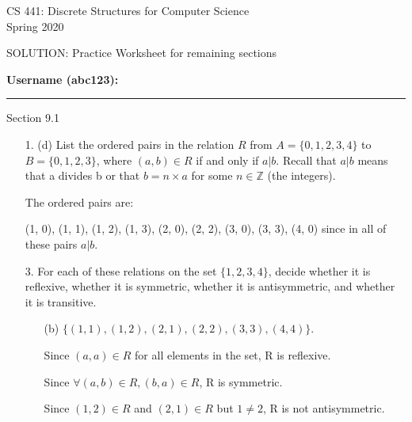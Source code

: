 \documentclass[12pt]{article}
\newcommand\bufprob{\vspace{2.0in}}
\newenvironment{answer}{\larger[2]}{}
\begin{document}
\begin{center}
CS 441: Discrete Structures for Computer Science \\
{\smaller[1] Spring 2020} \\

\vspace {0.25in}

SOLUTION: Practice Worksheet for remaining sections
\end{center}

\vspace{0.25in}

{\smaller[1]
\textbf{Username (abc123):} \rule{1.25in}{0.4pt}
}

\begin{center}
    {\large Section 9.1}
\end{center}

\begin{enumerate} %


\item[1. (d)] List the ordered pairs in the relation $R$ from $A = \{ 0,1,2,3,4 \}$ to $B = \{ 0, 1, 2, 3 \}$, where $(a,b) \in R$ if and only if $a | b$. Recall that $a | b$ means that a divides b or that $b = n \times a$ for some $n \in \mathbb{Z}$ (the integers).

\begin{answer}
   The ordered pairs are:
   
   (1, 0), (1, 1), (1, 2), (1, 3), (2, 0), (2, 2), (3, 0), (3, 3), (4, 0) since in all of these pairs $a | b$.
\end{answer}

\bufprob
%



\item[3.] For each of these relations on the set $\{ 1,2,3,4 \}$, decide whether it is reflexive, whether it is symmetric, whether it is antisymmetric, and whether it is transitive.

\begin{enumerate}
    \item[(b)] $\{ (1,1), (1,2), (2,1), (2,2), (3,3), (4,4) \}$.
    
    \begin{answer}
        Since $(a, a) \in R$ for all elements in the set, R is reflexive.

        Since $\forall (a, b) \in R, (b, a) \in R$, R is symmetric. 

        Since $(1, 2) \in R$ and $(2, 1) \in R$ but $1 \neq 2$, R is not antisymmetric.


\end{answer}
\end{enumerate}
\end{enumerate}
\end{document}
